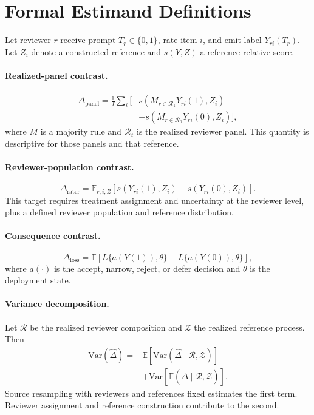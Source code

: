 \section{Formal Estimand Definitions}
\label{sec:estimand-formalization}

Let reviewer \(r\) receive prompt \(T_r\in\{0,1\}\), rate item \(i\), and emit
label \(Y_{ri}(T_r)\). Let \(Z_i\) denote a constructed reference and
\(s(Y,Z)\) a reference-relative score.

\paragraph{Realized-panel contrast.}
\[
\begin{aligned}
\Delta_{\mathrm{panel}}
= \frac{1}{I}\sum_i \bigl[&
s\!\left(M_{r\in\mathcal R_1}Y_{ri}(1),Z_i\right)\\[-2pt]
&-s\!\left(M_{r\in\mathcal R_0}Y_{ri}(0),Z_i\right)
\bigr],
\end{aligned}
\]
where \(M\) is a majority rule and \(\mathcal R_t\) is the realized reviewer
panel. This quantity is descriptive for those panels and that reference.

\paragraph{Reviewer-population contrast.}
\[
\Delta_{\mathrm{rater}}
=
\mathbb E_{r,i,Z}\!\left[
s(Y_{ri}(1),Z_i)-s(Y_{ri}(0),Z_i)
\right].
\]
This target requires treatment assignment and uncertainty at the reviewer
level, plus a defined reviewer population and reference distribution.

\paragraph{Consequence contrast.}
\[
\Delta_{\mathrm{loss}}
=
\mathbb E\!\left[
L\{a(Y(1)),\theta\}-L\{a(Y(0)),\theta\}
\right],
\]
where \(a(\cdot)\) is the accept, narrow, reject, or defer decision and
\(\theta\) is the deployment state.

\paragraph{Variance decomposition.}
Let \(\mathcal R\) be the realized reviewer composition and \(\mathcal Z\) the
realized reference process. Then
\[
\begin{aligned}
\mathrm{Var}(\widehat\Delta)
={}&
\mathbb E\!\left[
\mathrm{Var}(\widehat\Delta\mid\mathcal R,\mathcal Z)
\right]\\
&+
\mathrm{Var}\!\left[
\mathbb E(\widehat\Delta\mid\mathcal R,\mathcal Z)
\right].
\end{aligned}
\]
Source resampling with reviewers and references fixed estimates the first
term. Reviewer assignment and reference construction contribute to the
second.

